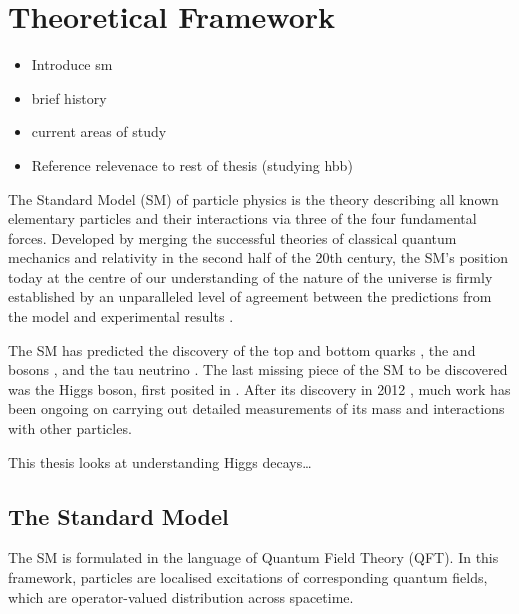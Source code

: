 \chapter{Theoretical Framework}\label{chap:theory}

\begin{itemize}
  \item Introduce sm
  \item brief history
  \item current areas of study
  \item Reference relevenace to rest of thesis (studying hbb)
\end{itemize}

The Standard Model (SM) of particle physics is the theory describing all known elementary particles and their interactions via three of the four fundamental forces.
Developed by merging the successful theories of classical quantum mechanics and relativity in the second half of the 20th century, the SM's position today at the centre of our understanding of the nature of the universe is firmly established by an unparalleled level of agreement between the predictions from the model and experimental results \cite{morel2020determination,sailer2022measurement}.

The SM has predicted the discovery of the top and bottom quarks \cite{CDF:1995wbb,D0:1995jca,Herb:1977ek}, the \Wboson and \Zboson bosons \cite{UA1:1983crd}, and the tau neutrino \cite{DONUT:2000fbd}.
The last missing piece of the SM to be discovered was the Higgs boson, first posited in .
After its discovery in 2012 , much work has been ongoing on carrying out detailed measurements of its mass and interactions with other particles.

This thesis looks at understanding Higgs decays\dots


\section{The Standard Model}\label{sec:standard_model}

The SM is formulated in the language of Quantum Field Theory (QFT).
In this framework, particles are localised excitations of corresponding quantum fields, which are operator-valued distribution across spacetime.

